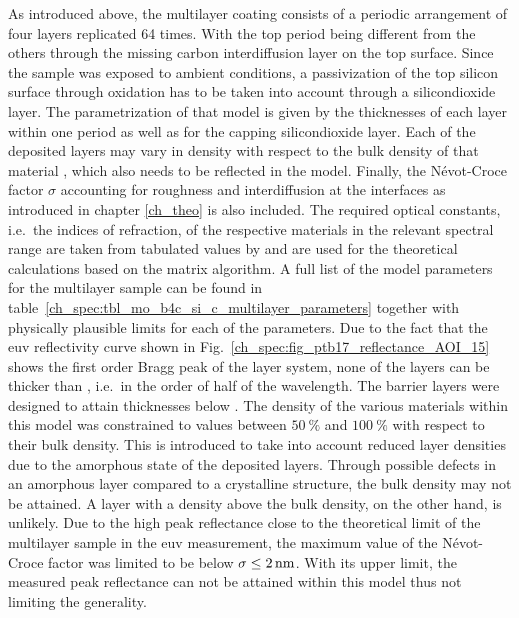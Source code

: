As introduced above, the multilayer coating consists of a periodic arrangement of four layers replicated 64 times. With the top period being different from the others through the missing carbon interdiffusion layer on the top surface. Since the sample was exposed to ambient conditions, a passivization of the top silicon surface through oxidation has to be taken into account through a silicondioxide layer. The parametrization of that model is given by the thicknesses of each layer within one period as well as for the capping silicondioxide layer. Each of the deposited layers may vary in density with respect to the bulk density of that material \cite{braun_mo/si_2002}, which also needs to be reflected in the model. Finally, the N{\'e}vot-Croce factor $\sigma$ accounting for roughness and interdiffusion at the interfaces as introduced in chapter \ref{ch_theo} is also included. The required optical constants, i.e.~the indices of refraction, of the respective materials in the relevant spectral range are taken from tabulated values by \textcite{henke_x-ray_1993} and are used for the theoretical calculations based on the matrix algorithm. A full list of the model parameters for the multilayer sample can be found in table~\ref{ch_spec:tbl_mo_b4c_si_c_multilayer_parameters} together with physically plausible limits for each of the parameters. Due to the fact that the \gls{euv} reflectivity curve shown in Fig.~\ref{ch_spec:fig_ptb17_reflectance_AOI_15} shows the first order Bragg peak of the layer system, none of the layers can be thicker than , i.e.~in the order of half of the wavelength. The barrier layers were designed to attain thicknesses below . The density of the various materials within this model was constrained to values between $\SI{50}{\percent}$ and $\SI{100}{\percent}$ with respect to their bulk density. This is introduced to take into account reduced layer densities due to the amorphous state of the deposited layers. Through possible defects in an amorphous layer compared to a crystalline structure, the bulk density may not be attained. A layer with a density above the bulk density, on the other hand, is unlikely. Due to the high peak reflectance close to the theoretical limit of the multilayer sample in the \gls{euv} measurement, the maximum value of the N{\'e}vot-Croce factor was limited to be below $\sigma \leq \nm{2}$. With its upper limit, the measured peak reflectance can not be attained within this model thus not limiting the generality.
